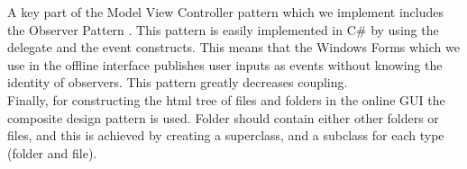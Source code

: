 \newline
A key part of the Model View Controller pattern which we implement includes the Observer Pattern \cite[p.~377]{OOAD}. This pattern is easily implemented in C\# by using the delegate and the event constructs. This means that the Windows Forms which we use in the offline interface publishes user inputs as events without knowing the identity of observers. This pattern greatly decreases coupling. \\
\newline
Finally, for constructing the html tree of files and folders in the online GUI the composite design pattern \cite[p.~453]{OOAD} is used. Folder should contain either other folders or files, and this is achieved by creating a superclass, and a subclass for each type (folder and file). \\
\newpage